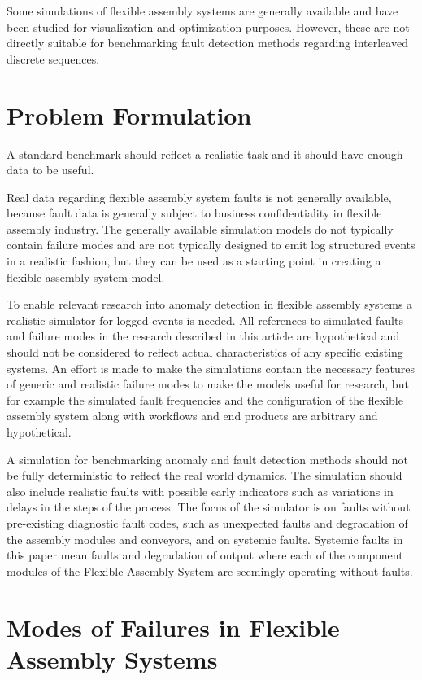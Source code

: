 \documentclass[journal]{IEEEtran}
\begin{document}
Some simulations of flexible assembly systems are generally available\cite{giulio} and have been studied for visualization and optimization purposes.
However, these are not directly suitable for benchmarking fault detection methods regarding interleaved discrete sequences.

\section{Problem Formulation}

A standard benchmark should reflect a realistic task and it should have enough data to be useful.

Real data regarding flexible assembly system faults is
not generally available, because fault data is generally subject to business confidentiality in flexible assembly industry.
The generally available simulation models do not typically contain failure modes and are not typically designed to emit
log structured events in a realistic fashion, but they can be used as a starting point in creating a flexible assembly system model.

To enable relevant research into anomaly detection in flexible assembly systems a realistic simulator for logged events is needed.
All references to simulated faults and failure modes in the research described in this article are hypothetical and should not be considered to
reflect actual characteristics of any specific existing systems. An effort is made to make the simulations contain the necessary features of
generic and realistic failure modes to make the models useful for research, but for example the simulated fault frequencies and the configuration
of the flexible assembly system along with workflows and end products are arbitrary and hypothetical.

A simulation for benchmarking anomaly and fault detection methods should not be fully deterministic to reflect the real world dynamics. The simulation should also
include realistic faults with possible early indicators such as variations in delays in the steps of the process. The focus of the simulator is on faults without pre-existing
diagnostic fault codes, such as unexpected faults and degradation of the assembly modules and conveyors, and on systemic faults. Systemic faults in this paper
mean faults and degradation of output where each of the component modules of the Flexible Assembly System are seemingly operating without faults.

\section{Modes of Failures in Flexible Assembly Systems}
\end{document}
